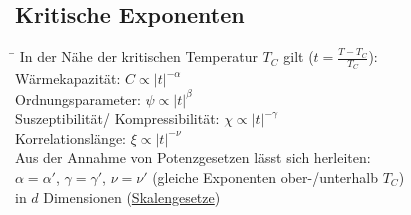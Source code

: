 \subsection{Kritische Exponenten}
\begin{tabbing}
\hspace{4em} \= \kill
In der Nähe der kritischen Temperatur $T_C$ gilt ($t = \frac{T-T_C}{T_C}$):\\
\> Wärmekapazität: $C \propto |t|^{-\alpha}$\\
\> Ordnungsparameter: $\psi \propto |t|^{\beta}$\\
\> Suszeptibilität/ Kompressibilität: $\chi \propto |t|^{-\gamma}$\\
\> Korrelationslänge: $\xi \propto |t|^{-\nu}$\\
Aus der Annahme von Potenzgesetzen lässt sich herleiten:\\
\> $\alpha =\alpha'$, $\gamma = \gamma'$, $\nu = \nu'$ (gleiche Exponenten ober-/unterhalb $T_C$)\\
 in $d$ Dimensionen (\underline{Skalengesetze})
\end{tabbing}
